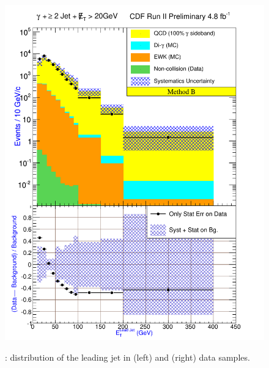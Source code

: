 \documentclass[11pt]{article}
\begin{document}
\begin{figure}[h!]
{ \includegraphics[scale=\resultsHistScale,keepaspectratio=true]{./g30jetmet20_MtdB_plot2_Et_j1.pdf}
}
 \caption{: \et distribution of the leading jet in \phoonejetmettwenty (left) and \photwojetmettwenty (right) data samples.}
 \label{fig:Result_MtdB_gj1Met20_JetEt}
\end{figure}
\end{document}
